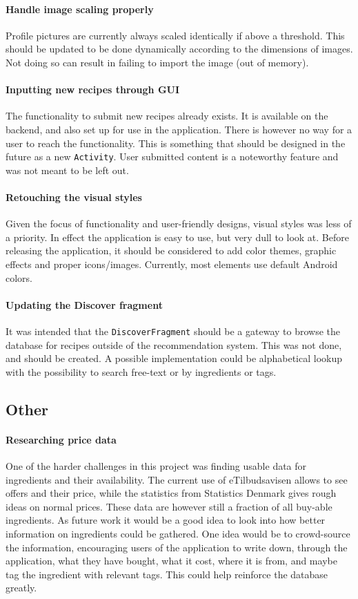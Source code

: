 \paragraph{Handle image scaling properly}
Profile pictures are currently always scaled identically if above a threshold. This should be updated to be done dynamically according to the dimensions of images. Not doing so can result in failing to import the image (out of memory).

\paragraph{Inputting new recipes through GUI}
The functionality to submit new recipes already exists. It is available on the backend, and also set up for use in the application. There is however no way for a user to reach the functionality. This is something that should be designed in the future as a new \texttt{Activity}. User submitted content is a noteworthy feature and was not meant to be left out.

\paragraph{Retouching the visual styles}
Given the focus of functionality and user-friendly designs, visual styles was less of a priority. In effect the application is easy to use, but very dull to look at. Before releasing the application, it should be considered to add color themes, graphic effects and proper icons/images. Currently, most elements use default Android colors.

\paragraph{Updating the Discover fragment}
It was intended that the \texttt{DiscoverFragment} should be a gateway to browse the database for recipes outside of the recommendation system. This was not done, and should be created. A possible implementation could be alphabetical lookup with the possibility to search free-text or by ingredients or tags.

\subsection{Other}

\paragraph{Researching price data}
One of the harder challenges in this project was finding usable data for ingredients and their availability. The current use of eTilbudsavisen allows to see offers and their price, while the statistics from Statistics Denmark gives rough ideas on normal prices.
These data are however still a fraction of all buy-able ingredients. As future work it would be a good idea to look into how better information on ingredients could be gathered.
One idea would be to crowd-source the information, encouraging users of the application to write down, through the application, what they have bought, what it cost, where it is from, and maybe tag the ingredient with relevant tags. This could help reinforce the database greatly.